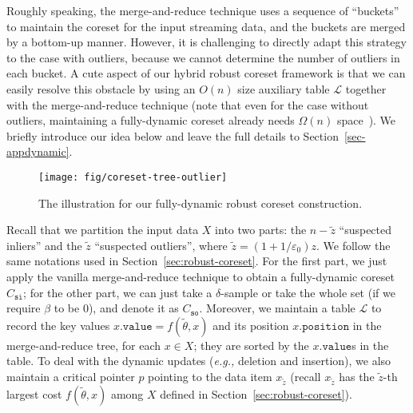 \documentclass{article}
\begin{document}
Roughly speaking, the merge-and-reduce technique uses a sequence of ``buckets'' to maintain the coreset for the input streaming data, and the buckets are merged by a bottom-up manner. However, it is challenging to directly adapt this strategy to the case with outliers, because we cannot determine the number of outliers in each bucket. 
A cute aspect of our hybrid robust coreset framework is that we can easily resolve this obstacle by using an $O(n)$ size auxiliary table $\mathscr{L}$ together with the merge-and-reduce technique (note that even for the case without outliers, maintaining a fully-dynamic coreset already needs $\Omega(n)$ space~\cite{HenzingerK20}). We briefly introduce our idea below and leave the full details to Section~\ref{sec-appdynamic}. 

\begin{wrapfigure}{r}{7cm}
	\vspace{-0.4cm}
	\centering
	\texttt{[image: fig/coreset-tree-outlier]}
	\caption{The illustration for our fully-dynamic robust coreset construction.}
	\vspace{-0.3cm}
	\label{fig-coreset-tree-outlier}
\end{wrapfigure}


Recall that we partition the input data $X$ into two parts: the $n-\tilde{z}$ ``suspected inliers'' and the $\tilde{z}$ ``suspected outliers'', where $\tilde{z}=(1+1/\varepsilon_0)z$. We follow the same notations used in Section~\ref{sec:robust-coreset}. For the first part, we just apply the vanilla merge-and-reduce technique to obtain a fully-dynamic coreset $C_{\mathtt{si}}$; for the other part, we can just take a $\delta$-sample or take the whole set (if we require $\beta$ to be $0$), and denote it as $C_{\mathtt{so}}$. Moreover, we maintain a table $\mathscr{L}$ to record the key values $ x.\mathtt{value}= f(\tilde{\theta},x)$ and its position $ x.\mathtt{position} $ in the merge-and-reduce tree, for each $x\in X$; they are sorted by the $x.\mathtt{value}$s in the table. To deal with the dynamic updates ({\em e.g.,} deletion and insertion), we also maintain a critical pointer $ p $ pointing to the data item $ x_{\tilde{z}} $ (recall $x_{\tilde{z}}$ has the $ \tilde{z}$-th largest cost $ f(\tilde{\theta},x) $ among $X$ defined in Section~\ref{sec:robust-coreset}). 
\end{document}
